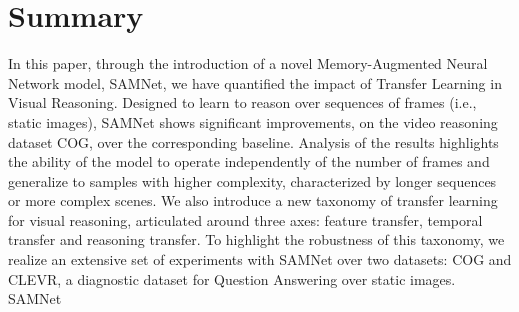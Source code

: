 \section{Summary}


In this paper, through the introduction of a novel Memory-Augmented Neural Network model, SAMNet, we have quantified the impact of Transfer Learning in Visual Reasoning. Designed to learn to reason over sequences of frames (i.e., static images), SAMNet shows significant improvements, on the video reasoning dataset COG, over the corresponding baseline. Analysis of the results highlights the ability of the model to operate independently of the number of frames and generalize to samples with higher complexity, characterized by longer sequences or more complex scenes.
We also introduce a new taxonomy of transfer learning for visual reasoning, articulated around three axes: feature transfer, temporal transfer and reasoning transfer. To highlight the robustness of this taxonomy, we realize an extensive set of experiments with SAMNet over two datasets: COG and CLEVR, a diagnostic dataset for Question Answering over static images. SAMNet 